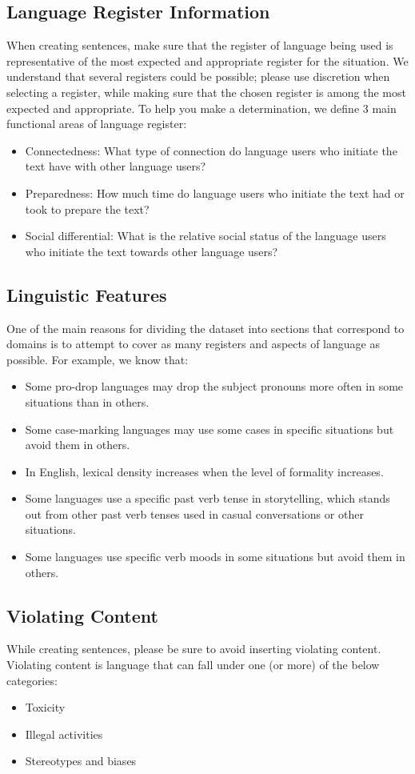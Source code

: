\subsection{Language Register Information}
When creating sentences, make sure that the register of language being used is representative of the most expected and appropriate register for the situation. We understand that several registers could be possible; please use discretion when selecting a register, while making sure that the chosen register is among the most expected and appropriate. To help you make a determination, we define 3 main functional areas of language register:
\begin{itemize}
\item Connectedness: What type of connection do language users who initiate the text have with other language users?
\item Preparedness: How much time do language users who initiate the text had or took to prepare the text?
\item Social differential: What is the relative social status of the language users who initiate the text towards other language users?
\end{itemize}

\subsection{Linguistic Features}
One of the main reasons for dividing the dataset into sections that correspond to domains is to attempt to cover as many registers and aspects of language as possible. For example, we know that:
\begin{itemize}
\item Some pro-drop languages may drop the subject pronouns more often in some situations than in others.
\item Some case-marking languages may use some cases in specific situations but avoid them in others.
\item In English, lexical density increases when the level of formality increases.
\item Some languages use a specific past verb tense in storytelling, which stands out from other past verb tenses used in casual conversations or other situations.
\item Some languages use specific verb moods in some situations but avoid them in others.
\end{itemize}

\subsection{Violating Content}
While creating sentences, please be sure to avoid inserting violating content. Violating content is language that can fall under one (or more) of the below categories:
\begin{itemize}
\item Toxicity
\item Illegal activities
\item Stereotypes and biases
\end{itemize}

